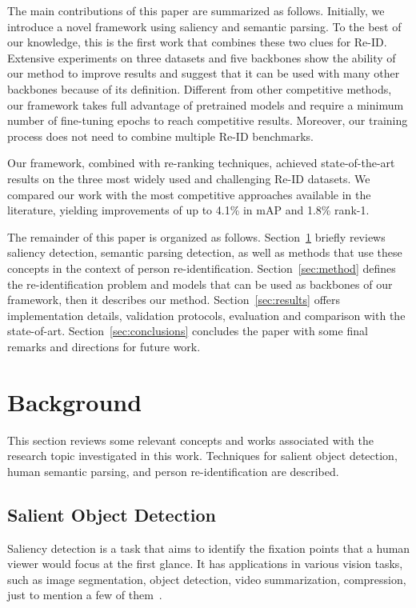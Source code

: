 \documentclass[final,3p,times,twocolumn]{elsarticle}
\begin{document}
The main contributions of this paper are summarized as follows. Initially, we introduce a novel framework using saliency and semantic parsing. To the best of our knowledge, this is the first work that combines these two clues for Re-ID. Extensive experiments on three datasets and five backbones show the ability of our method to improve results and suggest that it can be used with many other backbones because of its definition. Different from other competitive methods, our framework takes full advantage of pretrained models and require a minimum number of fine-tuning epochs to reach competitive results. Moreover, our training process does not need to combine multiple Re-ID benchmarks.

Our framework, combined with re-ranking techniques, achieved state-of-the-art results on the three most widely used and challenging Re-ID datasets. We compared our work with the most competitive approaches available in the literature, yielding improvements of up to 4.1\% in mAP and 1.8\% rank-1.

The remainder of this paper is organized as follows. Section~\ref{sec:background} briefly reviews saliency detection, semantic parsing detection, as well as methods that use these concepts in the context of person re-identification. Section~\ref{sec:method} defines the re-identification problem and models that can be used as backbones of our framework, then it describes our method. Section~\ref{sec:results} offers implementation details, validation protocols, evaluation and comparison with the state-of-art. Section~\ref{sec:conclusions} concludes the paper with some final remarks and directions for future work.
 \section{Background}
\label{sec:background}

This section reviews some relevant concepts and works associated with the research topic investigated in this work. Techniques for salient object detection, human semantic parsing, and person re-identification are described.

\subsection{Salient Object Detection}

Saliency detection is a task that aims to identify the fixation points that a human viewer would focus at the first glance. It has applications in various vision tasks, such as image segmentation, object detection, video summarization, compression, just to mention a few of them~\cite{wang2017deep}.
\end{document}
